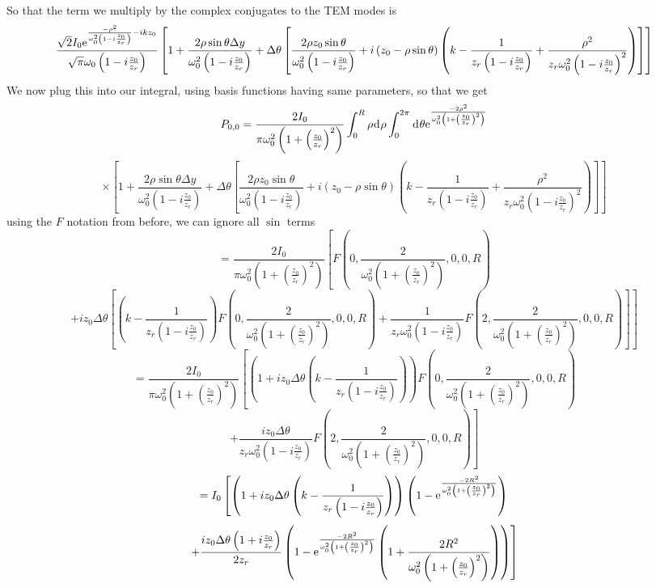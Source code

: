 \documentclass[11pt]{amsart}
\makeatletter
\newcommand{\e}{{\rm e}}				%
\newcommand{\msp}[1]{\mspace{#1mu}}		%
\newcommand{\0}{\varnothing}		%
\newcommand{\dd}{\msp{1} {\rm{d}} \msp{1}}	%
\newcommand{\1}{!}
\newcommand{\2}{@}
\newcommand{\3}{\#}
\newcommand{\4}{\$}
\newcommand{\5}{\%}
\newcommand{\6}{$^\wedge$}
\newcommand{\7}{\&}
\newcommand{\8}{*}
\newcommand{\9}{(}
\makeatother
\begin{document}
So that the term we multiply by the complex conjugates to the TEM modes is
\[
\frac{\sqrt{2}I_0\e^{\frac{-\rho^2}{\omega_0^2\left(1-i\frac{z_0}{z_r}\right)}-ikz_0}}{\sqrt{\pi}\omega_0\left(1-i\frac{z_0}{z_r}\right)}\left[1 + \frac{2\rho\sin\theta \Delta y}{\omega_0^2\left(1-i\frac{z_0}{z_r}\right)}+\Delta \theta\left[\frac{2\rho z_0\sin \theta}{\omega_0^2\left(1-i\frac{z_0}{z_r}\right)}+i\left(z_0-\rho\sin \theta\right)\left(k-\frac{1}{z_r\left(1-i\frac{z_0}{z_r}\right)}+\frac{\rho^2}{z_r\omega_0^2\left(1-i\frac{z_0}{z_r}\right)^2}\right)\right]\right]
\]
We now plug this into our integral, using basis functions having same parameters, so that we get
\[
P_{0,0} = \frac{2I_0}{\pi\omega_0^2\left(1+\left(\frac{z_0}{z_r}\right)^2\right)}\int_0^R\rho \dd \rho\int_0^{2\pi}\dd \theta \e^{\frac{-2\rho^2}{\omega_0^2\left(1+\left(\frac{z_0}{z_r}\right)^2\right)}}
\]
\[
\times \left[1+\frac{2\rho\sin \theta \Delta y}{\omega_0^2\left(1-i\frac{z_0}{z_r}\right)}+\Delta \theta\left[\frac{2\rho z_0\sin \theta}{\omega_0^2\left(1-i\frac{z_0}{z_r}\right)}+i\left(z_0-\rho\sin \theta\right)\left(k-\frac{1}{z_r\left(1-i\frac{z_0}{z_r}\right)}+\frac{\rho^2}{z_r\omega_0^2\left(1-i\frac{z_0}{z_r}\right)^2}\right)\right]\right]
\]
using the $F$ notation from before, we can ignore all $\sin$ terms
\[
=\frac{2I_0}{\pi \omega_0^2\left(1+\left(\frac{z_0}{z_r}\right)^2\right)}\left[F\left(0,\frac{2}{\omega_0^2\left(1+\left(\frac{z_0}{z_r}\right)^2\right)},0,0,R\right)\right.\]\[\left.+ iz_0\Delta \theta\left[\left(k-\frac{1}{z_r\left(1-i\frac{z_0}{z_r}\right)}\right)F\left(0,\frac{2}{\omega_0^2\left(1+\left(\frac{z_0}{z_r}\right)^2\right)},0,0,R\right) + \frac{1}{z_r\omega_0^2\left(1-i\frac{z_0}{z_r}\right)}F\left(2,\frac{2}{\omega_0^2\left(1+\left(\frac{z_0}{z_r}\right)^2\right)},0,0,R\right)\right]\right]
\]
\newpage
\[
=\frac{2I_0 }{\pi\omega_0^2\left(1+\left(\frac{z_0}{z_r}\right)^2\right)}\left[\left(1+iz_0\Delta \theta\left(k-\frac{1}{z_r\left(1-i\frac{z_0}{z_r}\right)}\right)\right)F\left(0,\frac{2}{\omega_0^2\left(1+\left(\frac{z_0}{z_r}\right)^2\right)},0,0,R\right)\right.\]\[\left.+
\frac{iz_0\Delta \theta}{z_r\omega_0^2\left(1-i\frac{z_0}{z_r}\right)}F\left(2,\frac{2}{\omega_0^2\left(1+\left(\frac{z_0}{z_r}\right)^2\right)},0,0,R\right)\right]
\]
\[
=I_0\left[\left(1+iz_0\Delta \theta \left(k-\frac{1}{z_r\left(1-i\frac{z_0}{z_r}\right)}\right)\right)\left(1-\e^{\frac{-2R^2}{\omega_0^2\left(1+\left(\frac{z_0}{z_r}\right)^2\right)}}\right)\right.\]
\[
\left.+\frac{iz_0\Delta \theta\left(1+i\frac{z_0}{z_r}\right)}{2z_r}\left(1-\e^{\frac{-2R^2}{\omega_0^2\left(1+\left(\frac{z_0}{z_r}\right)^2\right)}}\left(1+\frac{2R^2}{\omega_0^2\left(1+\left(\frac{z_0}{z_r}\right)^2\right)}\right)\right)\right]
\]
\end{document}
